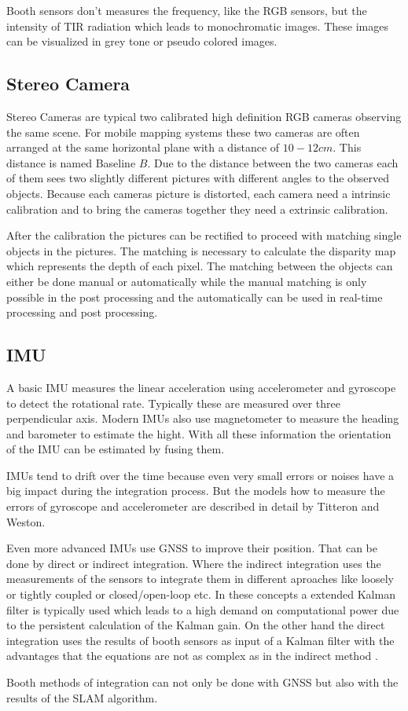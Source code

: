 Booth sensors don't measures the frequency, like the RGB sensors, but the intensity of \ac{TIR} radiation which leads to monochromatic images.
These images can be visualized in grey tone or pseudo colored images.

\subsection{Stereo Camera}\label{ssec:stereoCamera}
Stereo Cameras are typical two calibrated high definition RGB cameras observing the same scene.
For mobile mapping systems these two cameras are often arranged at the same horizontal plane with a distance of $10-12\si{cm}$.
This distance is named Baseline $B$.
Due to the distance between the two cameras each of them sees two slightly different pictures with different angles to the observed objects.
Because each cameras picture is distorted, each camera need a intrinsic calibration and to bring the cameras together they need a extrinsic calibration. 

After the calibration the pictures can be rectified to proceed with matching single objects in the pictures.
The matching is necessary to calculate the disparity map which represents the depth of each pixel.
The matching between the objects can either be done manual or automatically while the manual matching is only possible in the post processing and the automatically can be used in real-time processing and post processing.

\subsection{IMU}\label{ssec:imu}

A basic \ac{IMU} measures the linear acceleration using accelerometer and gyroscope to detect the rotational rate.
Typically these are measured over three perpendicular axis.
Modern \ac{IMU}s also use magnetometer to measure the heading and barometer to estimate the hight.
With all these information the orientation of the \ac{IMU} can be estimated by fusing them\cite{kim2004}.

\ac{IMU}s tend to drift over the time because even very small errors or noises have a big impact during the integration process.
But the models how to measure the errors of gyroscope and accelerometer are described in detail by Titteron and Weston\cite{titterton2005}.

Even more advanced \ac{IMU}s use \ac{GNSS} to improve their position.
That can be done by direct or indirect integration.
Where the indirect integration uses the measurements of the sensors to integrate them in different aproaches like loosely or tightly coupled or closed/open-loop etc.
In these concepts a extended Kalman filter is typically used which leads to a high demand on computational power due to the persistent calculation of the Kalman gain.
On the other hand the direct integration uses the results of booth sensors as input of a Kalman filter with the advantages that the equations are not as complex as in the indirect method \cite{Qi2002}.

Booth methods of integration can not only be done with \ac{GNSS} but also with the results of the \ac{SLAM} algorithm.

